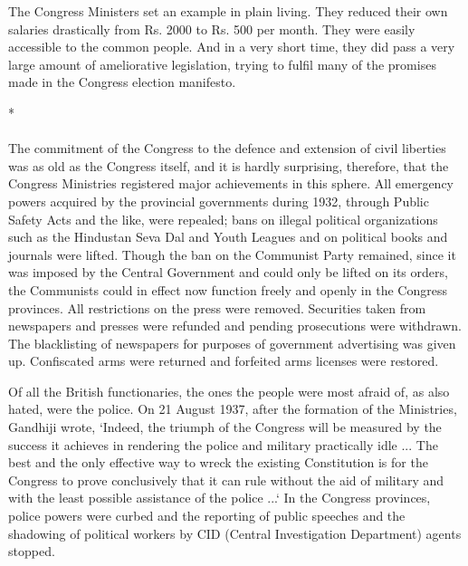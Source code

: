 \begin{multicols}{2}
The Congress Ministers set an example in plain living. They reduced their own salaries drastically from Rs. 2000 to Rs. 500 per month. They were easily accessible to the common people. And in a very short time, they did pass a very large amount of ameliorative legislation, trying to fulfil many of the promises made in the Congress election manifesto.

\begin{center}*\end{center}

\paragraph*{}

The commitment of the Congress to the defence and extension of civil liberties was as old as the Congress itself, and it is hardly surprising, therefore, that the Congress Ministries registered major achievements in this sphere. All emergency powers acquired by the provincial governments during 1932, through Public Safety Acts and the like, were repealed; bans on illegal political organizations such as the Hindustan Seva Dal and Youth Leagues and on political books and journals were lifted. Though the ban on the Communist Party remained, since it was imposed by the Central Government and could only be lifted on its orders, the Communists could in effect now function freely and openly in the Congress provinces. All restrictions on the press were removed. Securities taken from newspapers and presses were refunded and pending prosecutions were withdrawn. The blacklisting of newspapers for purposes of government advertising was given up. Confiscated arms were returned and forfeited arms licenses were restored. 

Of all the British functionaries, the ones the people were most afraid of, as also hated, were the police. On 21 August 1937, after the formation of the Ministries, Gandhiji wrote, `Indeed, the triumph of the Congress will be measured by the success it achieves in rendering the police and military practically idle ... The best and the only effective way to wreck the existing Constitution is for the Congress to prove conclusively that it can rule without the aid of military and with the least possible assistance of the police ...` In the Congress provinces, police powers were curbed and the reporting of public speeches and the shadowing of political workers by CID (Central Investigation Department) agents stopped. 


\end{multicols}
